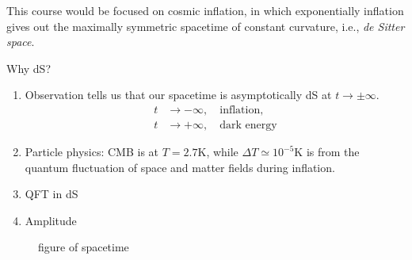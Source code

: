 This course would be focused on cosmic inflation, in which exponentially inflation gives out the maximally symmetric spacetime of constant curvature, i.e., \emph{de Sitter space}.

Why dS?
\begin{enumerate}
  \item Observation tells us that our spacetime is asymptotically dS at $t \to  \pm \infty $.
    \begin{equation*}
      \begin{aligned}
        t &\to -\infty ,\quad \text{inflation}, \\
        t &\to +\infty ,\quad  \text{dark energy}
      \end{aligned}
    \end{equation*}
  \item Particle physics: CMB is at $T = 2.7 \mathrm{K}$, while $\Delta T \simeq 10^{-5} \mathrm{K}$ is from the quantum fluctuation of space and matter fields during inflation.
  \item QFT in dS
  \item Amplitude
\end{enumerate}

\begin{figure}[ht]
    \centering
    \caption{figure of spacetime}
    \label{fig:figure-of-ads}
\end{figure}

